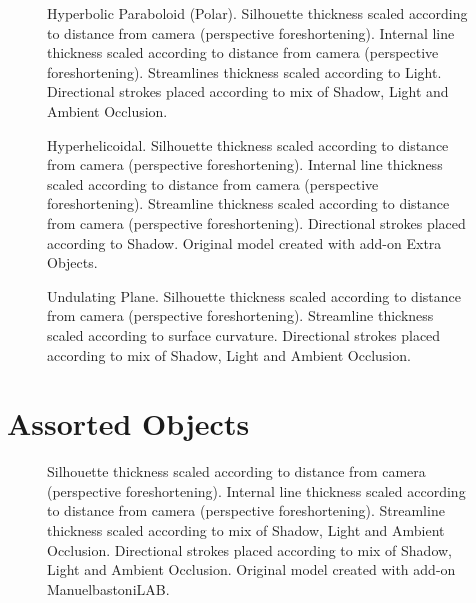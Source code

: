 \begin{figure}[h!]
	\centering
	
	\caption{Hyperbolic Paraboloid (Polar). Silhouette thickness scaled according to distance from camera (perspective foreshortening). Internal line thickness scaled according to distance from camera (perspective foreshortening). Streamlines thickness scaled according to Light. Directional strokes placed according to mix of Shadow, Light and Ambient Occlusion.}\label{render_hyperbolic_paraboloid_polar}
\end{figure}

\begin{figure}[h!]
	\centering
	
	\caption{Hyperhelicoidal. Silhouette thickness scaled according to distance from camera (perspective foreshortening). Internal line thickness scaled according to distance from camera (perspective foreshortening). Streamline thickness scaled according to distance from camera (perspective foreshortening). Directional strokes placed according to Shadow. Original model created with add-on Extra Objects.}\label{render_hyperhelicoidal}
\end{figure}

\begin{figure}[h!]
	\centering
	
	\caption{Undulating Plane. Silhouette thickness scaled according to distance from camera (perspective foreshortening). Streamline thickness scaled according to surface curvature. Directional strokes placed according to mix of Shadow, Light and Ambient Occlusion.}\label{render_undulating_plane}
\end{figure}

\FloatBarrier
\section{Assorted Objects}

\begin{figure}[h!]
	\centering
	
	\caption{Silhouette thickness scaled according to distance from camera (perspective foreshortening). Internal line thickness scaled according to distance from camera (perspective foreshortening). Streamline thickness scaled according to mix of Shadow, Light and Ambient Occlusion. Directional strokes placed according to mix of Shadow, Light and Ambient Occlusion. Original model created with add-on ManuelbastoniLAB.}\label{render_human1}
\end{figure}


